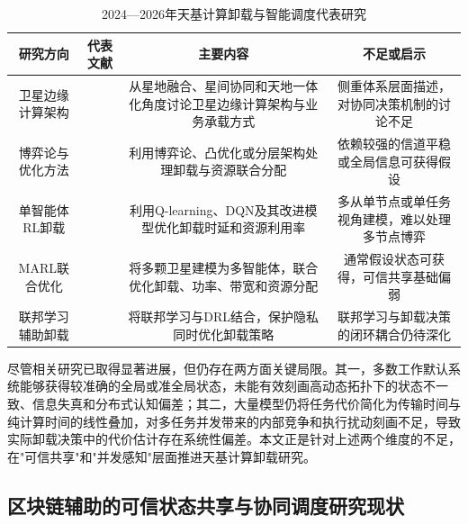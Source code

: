 \begin{table}[htbp]
  \centering
  \caption{2024—2026年天基计算卸载与智能调度代表研究}
  \label{tab:ch1_offloading_survey}
  \begin{tabularx}{\textwidth}{cCCC}
    \toprule
    \textbf{研究方向} & \textbf{代表文献}                                             & \textbf{主要内容}                       & \textbf{不足或启示}          \\
    \midrule
    卫星边缘计算架构      & \cite{Hu2023SECSurvey,Yin2025OECSurvey,Huang2024ICNLSMC}  & 从星地融合、星间协同和天地一体化角度讨论卫星边缘计算架构与业务承载方式 & 侧重体系层面描述，对协同决策机制的讨论不足   \\
    \addlinespace
    博弈论与优化方法      & \cite{ref19,ref20,Andrade2023,Sun2022,Ning2023}           & 利用博弈论、凸优化或分层架构处理卸载与资源联合分配           & 依赖较强的信道平稳或全局信息可获得假设     \\
    \addlinespace
    单智能体RL卸载      & \cite{Shuai2024Qlearning,Rao2025DiffusionLyapunov,Tang2022DRL,Lim2022DRLOS} & 利用Q-learning、DQN及其改进模型优化卸载时延和资源利用率  & 多从单节点或单任务视角建模，难以处理多节点博弈 \\
    \addlinespace
    MARL联合优化      & \cite{Li2024MARLComCom,Xiu2025MARATD3,ref23,Adu2026MADRL,Qin2023MARL,Zhang2024CollaborativeTVT} & 将多颗卫星建模为多智能体，联合优化卸载、功率、带宽和资源分配      & 通常假设状态可获得，可信共享基础偏弱      \\
    \addlinespace
    联邦学习辅助卸载      & \cite{ref22,ref26,ref30,Matthiesen2024FLSatellites}       & 将联邦学习与DRL结合，保护隐私同时优化卸载策略            & 联邦学习与卸载决策的闭环耦合仍待深化      \\
    \bottomrule
  \end{tabularx}
\end{table}

尽管相关研究已取得显著进展，但仍存在两方面关键局限。其一，多数工作默认系统能够获得较准确的全局或准全局状态，未能有效刻画高动态拓扑下的状态不一致、信息失真和分布式认知偏差；其二，大量模型仍将任务代价简化为传输时间与纯计算时间的线性叠加，对多任务并发带来的内部竞争和执行扰动刻画不足，导致实际卸载决策中的代价估计存在系统性偏差。本文正是针对上述两个维度的不足，在"可信共享"和"并发感知"层面推进天基计算卸载研究。

\subsection{区块链辅助的可信状态共享与协同调度研究现状}

